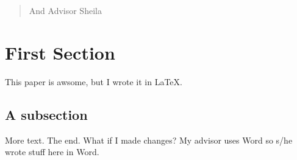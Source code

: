 \begin{quote}
And Advisor Sheila
\end{quote}

\section{First Section}\label{first-section}

This paper is awsome, but I wrote it in LaTeX.

\subsection{A subsection}\label{a-subsection}

More text. The end. What if I made changes? My advisor uses Word so s/he
wrote stuff here in Word.
